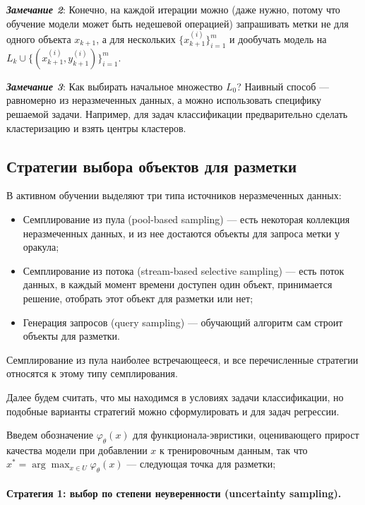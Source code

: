 \documentclass[specialist, 12pt, href]{article}
\begin{document}
\emph{\textbf{Замечание 2}}: Конечно, на каждой итерации можно (даже
нужно, потому что обучение модели может быть недешевой операцией)
запрашивать метки не для одного объекта \(x_{k + 1}\), а для нескольких
\(\{x_{k + 1}^{(i)}\}_{i = 1}^{m}\) и дообучать модель на
\(L_{k} \cup \{(x_{k + 1}^{(i)}, y_{k + 1}^{(i)})\}_{i = 1}^{m}\).

\emph{\textbf{Замечание 3}}: Как выбирать начальное множество \(L_0\)?
Наивный способ --- равномерно из неразмеченных данных, а можно
использовать специфику решаемой задачи. Например, для задач
классификации предварительно сделать кластеризацию и взять центры
кластеров.

\subsection{Стратегии выбора объектов для
разметки}

В активном обучении выделяют три типа источников неразмеченных данных:

\begin{itemize}
\item
  Семплирование из пула (pool-based sampling) --- есть некоторая
  коллекция неразмеченных данных, и из нее достаются объекты для запроса
  метки у оракула;
\item
  Семплирование из потока (stream-based selective sampling) --- есть
  поток данных, в каждый момент времени доступен один объект,
  принимается решение, отобрать этот объект для разметки или нет;
\item
  Генерация запросов (query sampling) --- обучающий алгоритм сам строит
  объекты для разметки.
\end{itemize}

Семплирование из пула наиболее встречающееся, и все перечисленные
стратегии относятся к этому типу семплирования.

Далее будем считать, что мы находимся в условиях задачи классификации,
но подобные варианты стратегий можно сформулировать и для задач
регрессии.

Введем обозначение \(\varphi_{\theta}(x)\) для функционала-эвристики,
оценивающего прирост качества модели при добавлении \(x\) к
тренировочным данным, так что
\(x^* = \arg\max_{x \in U} \varphi_{\theta}(x)\) --- следующая точка для
разметки;

\paragraph{Стратегия 1: выбор по степени неуверенности (uncertainty
sampling).}
\end{document}

